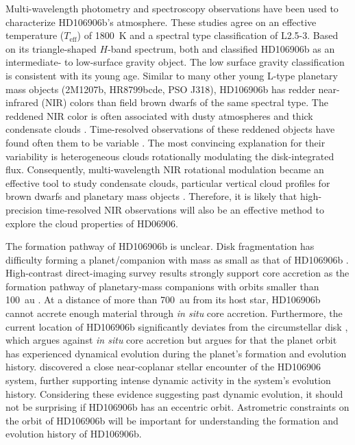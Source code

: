 \documentclass[twocolumn]{aastex62}
\newcommand{\teff}{\ensuremath{T_{\mathrm{eff}}}\xspace}
\newcommand{\editHL}[1]{{\color{blue}#1}}
\begin{document}
Multi-wavelength photometry \citep{Bailey2013,Kalas2015,Wu2016} and spectroscopy \citep{Bailey2013, Daemgen2017} observations have been used to characterize HD106906b's atmosphere.  These studies agree on an effective temperature (\teff) of 1800~K and a spectral type classification of L2.5-3. Based on its triangle-shaped $H$-band spectrum, both \citet{Bailey2013} and\citet{Daemgen2017} classified HD106906b as an intermediate- to low-surface gravity object. The low surface gravity classification is consistent with its young age. Similar to many other young L-type planetary mass objects (2M1207b, HR8799bcde, PSO J318), HD106906b has redder near-infrared (NIR) colors than field brown dwarfs of the same spectral type. The reddened NIR color is often associated with dusty atmospheres and thick condensate clouds \citep[e.g.,][]{Skemer2011}. Time-resolved observations of these reddened objects have found often them to be variable \citep[e.g.,][]{Biller2015,Zhou2016,Lew2016,Vos2017,Biller2017,Manjavacas2017,Zhou2019}. The most convincing explanation for their variability is heterogeneous clouds rotationally modulating the disk-integrated flux. Consequently, multi-wavelength NIR rotational modulation became an effective tool to  study condensate clouds, particular vertical cloud profiles for brown dwarfs and planetary mass objects \citep[e.g.,][]{Apai2013, Biller2017, Zhou2018}. Therefore, it is likely that high-precision time-resolved NIR observations will also be an effective method to explore the cloud properties of HD06906.


The formation pathway of HD106906b is unclear. Disk fragmentation has difficulty forming a planet/companion with mass as small as that of HD106906b \citep[e.g.,][]{Kratter2010}. \editHL{High-contrast direct-imaging survey results strongly support core accretion as the formation pathway of planetary-mass companions with orbits smaller than 100~au \citep{Wagner2019,Nielsen2019}. } At a distance of more than 700~au from its host star, HD106906b cannot accrete enough material through \emph{in situ} core accretion. Furthermore, the current location of HD106906b significantly deviates from the circumstellar disk \citep{Bailey2013,Kalas2015}, which argues against \emph{in situ} core accretion but argues for that the planet orbit has experienced dynamical evolution during the planet's formation and evolution history.  \citep{DeRosa2019} discovered a close near-coplanar stellar encounter of the HD106906 system, further supporting intense dynamic activity in the system's evolution history. Considering these evidence suggesting past dynamic evolution, it should not be surprising if HD106906b has an eccentric orbit. Astrometric constraints on the orbit of HD106906b will be important for understanding the formation and evolution history of HD106906b.
\end{document}
